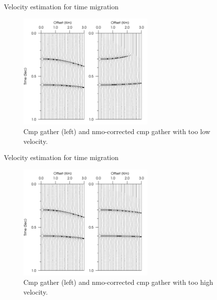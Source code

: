 \documentclass[xcolor=dvipsnames,notes]{beamer}
\begin{document}
\begin{frame}{Velocity estimation for time migration}
\begin{figure}
\includegraphics[width=0.6\textwidth]{Fig/si-fig-nmo-low.pdf}
\caption{Cmp gather (left) and nmo-corrected cmp gather with too low velocity.}
\label{fig:si-fig-nmo-low}
\end{figure}
%
\end{frame}
\begin{frame}{Velocity estimation for time migration}
%
\begin{figure}
\includegraphics[width=0.6\textwidth]{Fig/si-fig-nmo-high.pdf}
\caption{Cmp gather (left) and nmo-corrected cmp gather with too high velocity.}
\label{fig:si-fig-nmo-high}
\end{figure}
%
\end{frame}
\end{document}
